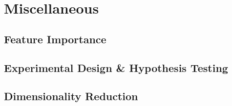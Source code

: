 \chapter{Miscellaneous}
\label{chap:misc}

\section{Feature Importance}
\label{misc:feature_importance}

\section{Experimental Design \& Hypothesis Testing}
\label{misc:exp_design}

\section{Dimensionality Reduction}
\label{misc:m_reduction}

